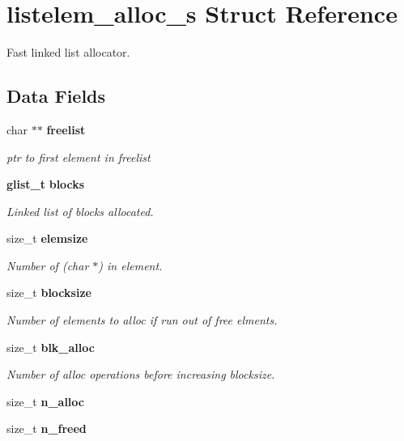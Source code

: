 \section{listelem\_\-alloc\_\-s Struct Reference}
\label{structlistelem__alloc__s}
Fast linked list allocator.  


\subsection*{Data Fields}
\begin{CompactItemize}
\item 
char $\ast$$\ast$ {\bf freelist}\label{structlistelem__alloc__s_2c3be8623c5bb2d4afb3ad888790a4eb}

\begin{CompactList}\small\item\em ptr to first element in freelist \item\end{CompactList}\item 
{\bf glist\_\-t} {\bf blocks}
\begin{CompactList}\small\item\em Linked list of blocks allocated. \item\end{CompactList}\item 
size\_\-t {\bf elemsize}\label{structlistelem__alloc__s_9e27c7163c45a43f8dfd667cbc014f49}

\begin{CompactList}\small\item\em Number of (char $\ast$) in element. \item\end{CompactList}\item 
size\_\-t {\bf blocksize}\label{structlistelem__alloc__s_ef58c358a0b764872b322e6c3c4c19b8}

\begin{CompactList}\small\item\em Number of elements to alloc if run out of free elments. \item\end{CompactList}\item 
size\_\-t {\bf blk\_\-alloc}\label{structlistelem__alloc__s_b96fd1e097105a34d6ae2e79ae8e2520}

\begin{CompactList}\small\item\em Number of alloc operations before increasing blocksize. \item\end{CompactList}\item 
size\_\-t \textbf{n\_\-alloc}\label{structlistelem__alloc__s_2a2fa0a7a1e03d6aee2f685dbc1db774}

\item 
size\_\-t \textbf{n\_\-freed}\label{structlistelem__alloc__s_dde313f665b6f2be9ea22f4d209e576d}

\end{CompactItemize}


